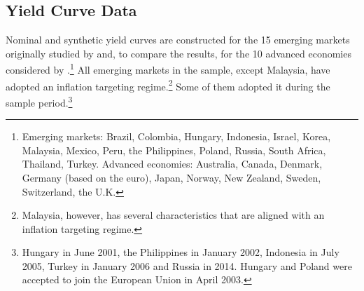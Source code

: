 {\subsection{Yield Curve Data}
\iftoggle{toclinks}{\gototoc}{} %

Nominal and synthetic yield curves are constructed for the 15 emerging markets originally studied by \cite{DuSchreger:2016JoF} and, to compare the results, for the 10 advanced economies %
considered by \cite{DuImSchreger:2018JIE}.\footnote{ Emerging markets: Brazil, Colombia, Hungary, Indonesia, Israel, Korea, Malaysia, Mexico, Peru, the Philippines, Poland, Russia, South Africa, Thailand, Turkey. Advanced economies: Australia, Canada, Denmark, Germany (based on the euro), Japan, Norway, New Zealand, Sweden, Switzerland, the U.K.}  
All emerging markets in the sample, except Malaysia, have adopted an inflation targeting regime.\footnote{ Malaysia, however, has several characteristics that are aligned with an inflation targeting regime.}  %
Some of them adopted it 
during the sample period.\footnote{ Hungary in June 2001, the Philippines in January 2002, Indonesia in July 2005, Turkey in January 2006 and Russia in 2014. Hungary and Poland were accepted to join the European Union in April 2003.}

}
